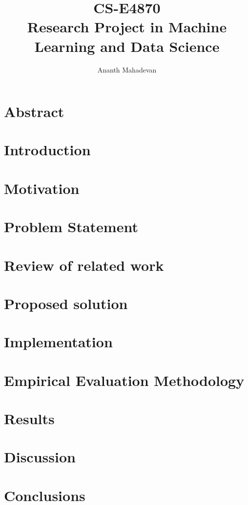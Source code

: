 \documentclass[a4paper,11pt]{article}
\title{CS-E4870 \\
        \large Research Project in Machine Learning and Data Science}
\author{Ananth Mahadevan}
\begin{document}
\maketitle

\section{Abstract}
\section{Introduction}
\section{Motivation}
\section{Problem Statement}
\section{Review of related work}
\section{Proposed solution}
\section{Implementation}
\section{Empirical Evaluation Methodology}
\section{Results}
\section{Discussion}
\section{Conclusions}
\end{document}
